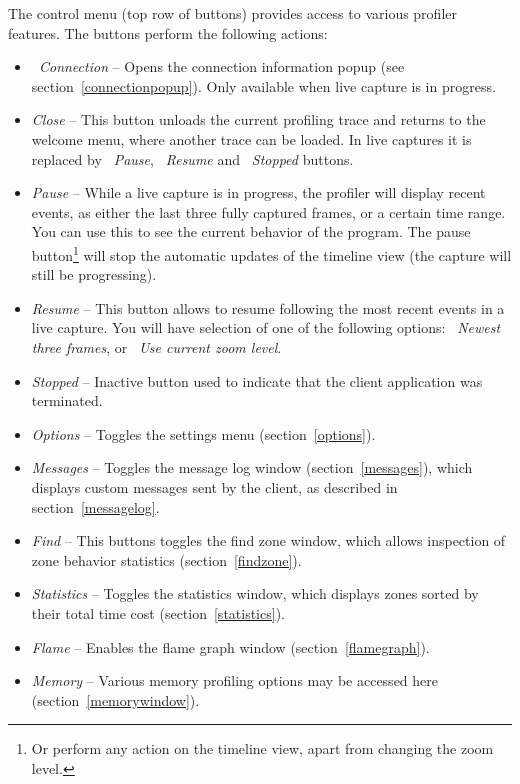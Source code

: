 \documentclass[hidelinks,titlepage,a4paper,twoside]{article}
\begin{document}
The control menu (top row of buttons) provides access to various profiler features. The buttons perform the following actions:

\begin{itemize}
\item \emph{\faWifi{}~Connection} -- Opens the connection information popup (see section~\ref{connectionpopup}). Only available when live capture is in progress.
\item \emph{\faPowerOff{} Close} -- This button unloads the current profiling trace and returns to the welcome menu, where another trace can be loaded. In live captures it is replaced by \emph{\faPause{}~Pause}, \emph{\faPlay{}~Resume} and \emph{\faSquare{}~Stopped} buttons.
\item \emph{\faPause{} Pause} -- While a live capture is in progress, the profiler will display recent events, as either the last three fully captured frames, or a certain time range. You can use this to see the current behavior of the program. The pause button\footnote{Or perform any action on the timeline view, apart from changing the zoom level.} will stop the automatic updates of the timeline view (the capture will still be progressing).
\item \emph{\faPlay{} Resume} -- This button allows to resume following the most recent events in a live capture. You will have selection of one of the following options: \emph{\faSearchPlus{}~Newest three frames}, or \emph{\faRulerHorizontal{}~Use current zoom level}.
\item \emph{\faSquare{} Stopped} -- Inactive button used to indicate that the client application was terminated.
\item \emph{\faCog{} Options} -- Toggles the settings menu (section~\ref{options}).
\item \emph{\faTags{} Messages} -- Toggles the message log window (section~\ref{messages}), which displays custom messages sent by the client, as described in section~\ref{messagelog}.
\item \emph{\faSearch{} Find} -- This buttons toggles the find zone window, which allows inspection of zone behavior statistics (section~\ref{findzone}).
\item \emph{\faSortAmountUp{} Statistics} -- Toggles the statistics window, which displays zones sorted by their total time cost (section~\ref{statistics}).
\item \emph{\faFire{} Flame} -- Enables the flame graph window (section~\ref{flamegraph}).
\item \emph{\faMemory{} Memory} -- Various memory profiling options may be accessed here (section~\ref{memorywindow}).

\end{itemize}
\end{document}
